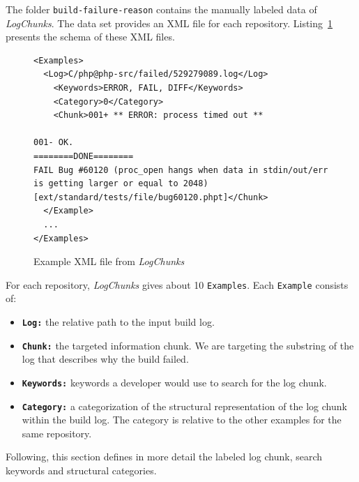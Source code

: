 \documentclass[\myrootdir/main.tex]{subfiles}
\begin{document}
The folder \texttt{build-failure-reason} contains the manually labeled data of \emph{LogChunks}.
The data set provides an XML file for each repository.
Listing~\ref{lst:examples} presents the schema of these XML files.

\begin{figure}[]
	\centering
\begin{lstlisting}[breaklines=true]
<Examples>
  <Log>C/php@php-src/failed/529279089.log</Log>
    <Keywords>ERROR, FAIL, DIFF</Keywords>
    <Category>0</Category>
    <Chunk>001+ ** ERROR: process timed out **

001- OK.
========DONE========
FAIL Bug #60120 (proc_open hangs when data in stdin/out/err is getting larger or equal to 2048) [ext/standard/tests/file/bug60120.phpt]</Chunk>
  </Example>
  ...
</Examples>
\end{lstlisting}
	\caption{Example XML file from \emph{LogChunks}}
	\label{lst:examples}
\end{figure}

For each repository, \emph{LogChunks} gives about 10 \texttt{Examples}.
Each \texttt{Example} consists of:
\begin{itemize}
	\item \textbf{\texttt{Log:}} the relative path to the input build log.
	\item \textbf{\texttt{Chunk:}} the targeted information chunk. We are targeting the substring of the log that describes why the build failed.
	\item \textbf{\texttt{Keywords:}} keywords a developer would use to search for the log chunk.
	\item \textbf{\texttt{Category:}} a categorization of the structural representation of the log chunk within the build log.
				The category is relative to the other examples for the same repository.
\end{itemize}
Following, this section defines in more detail the labeled log chunk, search keywords and structural categories.
\end{document}
